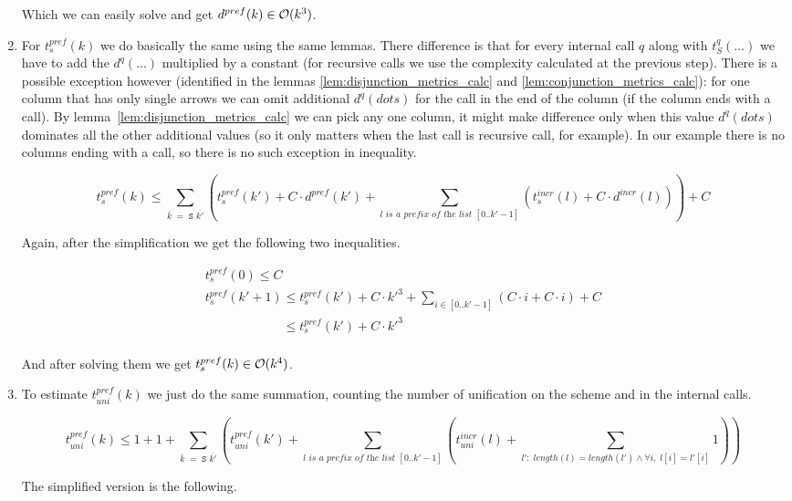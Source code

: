 \begin{enumerate}
Which we can easily solve and get $d^{pref}(k) \in \mathcal{O}(k^3)$.

\item For $t_s^{pref}(k)$ we do basically the same using the same lemmas. There difference is that for every internal call $q$ along with $t_S^q(\dots)$ we have to add the $d^q(\dots)$ multiplied by a constant (for recursive calls we use the complexity calculated at the previous step). There is a possible exception however (identified in the lemmas \ref{lem:disjunction_metrics_calc} and \ref{lem:conjunction_metrics_calc}): for one column that has only single arrows we can omit additional $d^q(dots)$ for the call in the end of the column (if the column ends with a call). By lemma~\ref{lem:disjunction_metrics_calc} we can pick any one column, it might make difference only when this value $d^q(dots)$ dominates all the other additional values (so it only matters when the last call is recursive call, for example). In our example there is no columns ending with a call, so there is no such exception in inequality.

\[ t_s^{pref}(k) \le \sum_{\overline{k} \;=\; \texttt{S $\overline{k'}$}} (t_s^{pref}(k') + C \cdot d^{pref}(k') + \sum_{\textit{$l$ is a prefix of the list $[0..k' - 1]$}} (t_s^{incr}(l) + C \cdot d^{incr}(l))) + C \]

Again, after the simplification we get the following two inequalities.

\[ \begin{array}{l}
t_s^{pref}(0) \le C \\
t_s^{pref}(k' + 1) \le t_s^{pref}(k') + C \cdot k'^3 + \sum_{i \in [0..k' - 1]} (C \cdot i + C \cdot i) + C \\
\phantom{t_s^{pref}(k' + 1)} \le t_s^{pref}(k') + C \cdot k'^3 \\
\end{array} \]

And after solving them we get $t_s^{pref}(k) \in \mathcal{O}(k^4)$.

\item To estimate $t_{uni}^{pref}(k)$ we just do the same summation, counting the number of unification on the scheme and in the internal calls.

\[ t_{uni}^{pref}(k) \le 1 + 1 + \sum_{\overline{k} \;=\; \texttt{S $\overline{k'}$}} (t_{uni}^{pref}(k') + \sum_{\textit{$l$ is a prefix of the list $[0..k' - 1]$}} (t_{uni}^{incr}(l) + \sum_{l': \; length(l) = length(l') \land \forall i, \; l[i] = l'[i]} 1)) \]

The simplified version is the following.


\end{enumerate}
